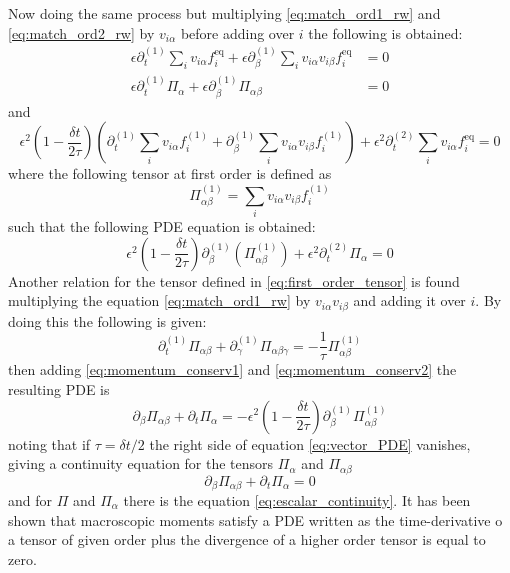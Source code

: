 Now doing the same process but multiplying \ref{eq:match_ord1_rw} and \ref{eq:match_ord2_rw} by $v_{i\alpha}$ before adding over $i$ the following is obtained:
\begin{align}\label{eq:momentum_conserv1}
    \epsilon\partial_t^{(1)}\sum_iv_{i\alpha}f_i^{\text{eq}}+\epsilon\partial_\beta^{(1)}\sum_iv_{i\alpha}v_{i\beta}f_i^{\text{eq}} &= 0 \nonumber\\
    \epsilon\partial_t^{(1)}\Pi_\alpha + \epsilon\partial_\beta^{(1)}\Pi_{\alpha\beta} &= 0
\end{align}
and
\begin{equation}
    \epsilon^2\left(1-\frac{\delta t}{2\tau}\right)\left(\partial_t^{(1)}\sum_iv_{i\alpha}f_i^{(1)}+\partial_\beta^{(1)}\sum_iv_{i\alpha}v_{i\beta}f_i^{(1)}\right) + \epsilon^2\partial_{t}^{(2)}\sum_iv_{i\alpha}f_i^{\text{eq}} = 0
\end{equation}
where the following tensor at first order is defined as
\begin{equation}\label{eq:first_order_tensor}
    \Pi_{\alpha\beta}^{(1)} = \sum_iv_{i\alpha}v_{i\beta}f_i^{(1)}
\end{equation}
such that the following PDE equation is obtained:
\begin{equation}\label{eq:momentum_conserv2}
    \epsilon^2\left(1-\frac{\delta t}{2\tau}\right)\partial_\beta^{(1)}\left(\Pi_{\alpha\beta}^{(1)}\right) + \epsilon^2\partial_t^{(2)}\Pi_{\alpha} = 0
\end{equation}
Another relation for the tensor defined in \ref{eq:first_order_tensor} is found multiplying the equation \ref{eq:match_ord1_rw} by $v_{i\alpha}v_{i\beta}$ and adding it over $i$. By doing this the following is given:
\begin{equation}\label{eq:Pi_order_one_viscosity}
    \partial_t^{(1)}\Pi_{\alpha\beta} + \partial_{\gamma}^{(1)}\Pi_{\alpha\beta\gamma} = - \frac{1}{\tau}\Pi_{\alpha\beta}^{(1)}
\end{equation}
then adding \ref{eq:momentum_conserv1} and \ref{eq:momentum_conserv2} the resulting PDE is
\begin{equation}\label{eq:vector_PDE}
    \partial_\beta\Pi_{\alpha\beta} + \partial_t\Pi_\alpha = -\epsilon^2\left(1 - \frac{\delta t}{2\tau}\right)\partial_\beta^{(1)}\Pi_{\alpha\beta}^{(1)}
\end{equation}
noting that if $\tau = \delta t/2$ the right side of equation \ref{eq:vector_PDE} vanishes, giving a continuity equation for the tensors $\Pi_\alpha$ and $\Pi_{\alpha\beta}$ 
\begin{equation}\label{eq:vector_continuity}
    \partial_\beta\Pi_{\alpha\beta} + \partial_t\Pi_\alpha = 0
\end{equation}
and for $\Pi$ and $\Pi_\alpha$ there is the equation \ref{eq:escalar_continuity}. It has been shown that macroscopic moments satisfy a PDE written as the time-derivative o a tensor of given order plus the divergence of a higher order tensor is equal to zero. 

